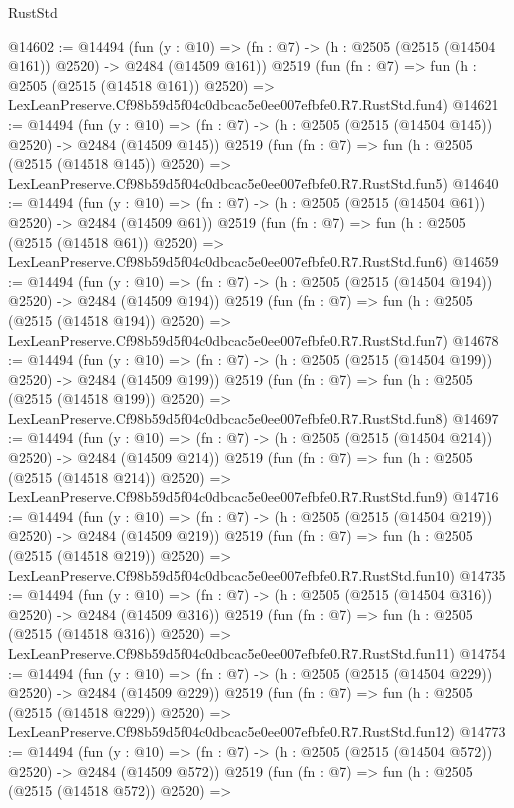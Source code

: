 \begin{lexlean}{RustStd}
\begin{coremodule}
@14602 := @14494
    (fun (y : @10) => (fn : @7) -> (h : @2505 (@2515 (@14504 @161)) @2520) -> @2484 (@14509 @161))
    @2519
    (fun (fn : @7) =>
    fun (h : @2505 (@2515 (@14518 @161)) @2520) =>
    LexLeanPreserve.Cf98b59d5f04c0dbcac5e0ee007efbfe0.R7.RustStd.fun4)
@14621 := @14494
    (fun (y : @10) => (fn : @7) -> (h : @2505 (@2515 (@14504 @145)) @2520) -> @2484 (@14509 @145))
    @2519
    (fun (fn : @7) =>
    fun (h : @2505 (@2515 (@14518 @145)) @2520) =>
    LexLeanPreserve.Cf98b59d5f04c0dbcac5e0ee007efbfe0.R7.RustStd.fun5)
@14640 := @14494
    (fun (y : @10) => (fn : @7) -> (h : @2505 (@2515 (@14504 @61)) @2520) -> @2484 (@14509 @61))
    @2519
    (fun (fn : @7) =>
    fun (h : @2505 (@2515 (@14518 @61)) @2520) =>
    LexLeanPreserve.Cf98b59d5f04c0dbcac5e0ee007efbfe0.R7.RustStd.fun6)
@14659 := @14494
    (fun (y : @10) => (fn : @7) -> (h : @2505 (@2515 (@14504 @194)) @2520) -> @2484 (@14509 @194))
    @2519
    (fun (fn : @7) =>
    fun (h : @2505 (@2515 (@14518 @194)) @2520) =>
    LexLeanPreserve.Cf98b59d5f04c0dbcac5e0ee007efbfe0.R7.RustStd.fun7)
@14678 := @14494
    (fun (y : @10) => (fn : @7) -> (h : @2505 (@2515 (@14504 @199)) @2520) -> @2484 (@14509 @199))
    @2519
    (fun (fn : @7) =>
    fun (h : @2505 (@2515 (@14518 @199)) @2520) =>
    LexLeanPreserve.Cf98b59d5f04c0dbcac5e0ee007efbfe0.R7.RustStd.fun8)
@14697 := @14494
    (fun (y : @10) => (fn : @7) -> (h : @2505 (@2515 (@14504 @214)) @2520) -> @2484 (@14509 @214))
    @2519
    (fun (fn : @7) =>
    fun (h : @2505 (@2515 (@14518 @214)) @2520) =>
    LexLeanPreserve.Cf98b59d5f04c0dbcac5e0ee007efbfe0.R7.RustStd.fun9)
@14716 := @14494
    (fun (y : @10) => (fn : @7) -> (h : @2505 (@2515 (@14504 @219)) @2520) -> @2484 (@14509 @219))
    @2519
    (fun (fn : @7) =>
    fun (h : @2505 (@2515 (@14518 @219)) @2520) =>
    LexLeanPreserve.Cf98b59d5f04c0dbcac5e0ee007efbfe0.R7.RustStd.fun10)
@14735 := @14494
    (fun (y : @10) => (fn : @7) -> (h : @2505 (@2515 (@14504 @316)) @2520) -> @2484 (@14509 @316))
    @2519
    (fun (fn : @7) =>
    fun (h : @2505 (@2515 (@14518 @316)) @2520) =>
    LexLeanPreserve.Cf98b59d5f04c0dbcac5e0ee007efbfe0.R7.RustStd.fun11)
@14754 := @14494
    (fun (y : @10) => (fn : @7) -> (h : @2505 (@2515 (@14504 @229)) @2520) -> @2484 (@14509 @229))
    @2519
    (fun (fn : @7) =>
    fun (h : @2505 (@2515 (@14518 @229)) @2520) =>
    LexLeanPreserve.Cf98b59d5f04c0dbcac5e0ee007efbfe0.R7.RustStd.fun12)
@14773 := @14494
    (fun (y : @10) => (fn : @7) -> (h : @2505 (@2515 (@14504 @572)) @2520) -> @2484 (@14509 @572))
    @2519
    (fun (fn : @7) =>
    fun (h : @2505 (@2515 (@14518 @572)) @2520) =>

\end{coremodule}
\end{lexlean}
